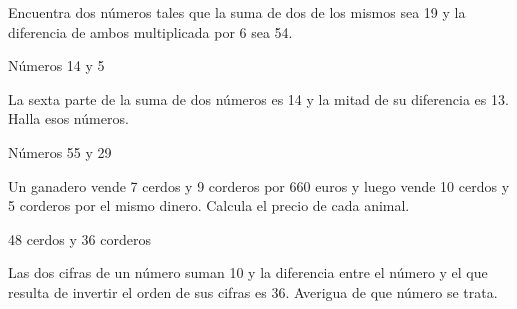 \documentclass[spanish, 12pt]{exam}
\begin{document}
\begin{questions}
\begin{multicols}{2}
\end{multicols}


\question Encuentra dos números tales que la suma de dos de los mismos sea 19 y la diferencia de ambos multiplicada por 6 sea 54.
\begin{solution} Números 14 y 5 \end{solution}

\question La sexta parte de la suma de dos números es 14 y la mitad de su diferencia es 13. Halla esos números.
\begin{solution} Números 55 y 29 \end{solution}

\question Un ganadero vende 7 cerdos y 9 corderos por 660 euros y luego vende 10 cerdos y 5 corderos por el mismo dinero. Calcula el precio de cada animal.
\begin{solution} 48 cerdos y 36 corderos \end{solution}

\question Las dos cifras de un número suman 10 y la diferencia entre el número y el que resulta de invertir el orden de sus cifras es 36. Averigua de que número se trata.


\end{questions}
\end{document}
